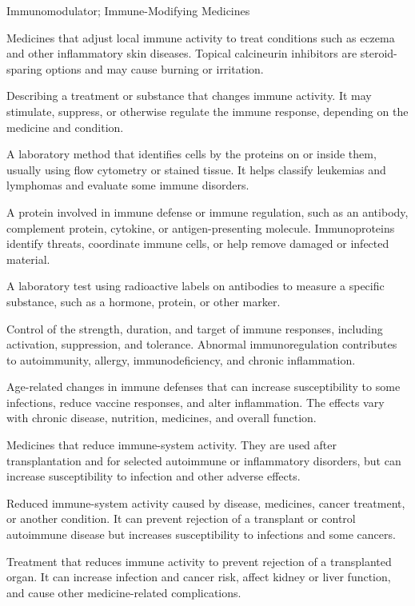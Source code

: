 \synonyms
Immunomodulator; Immune-Modifying Medicines

 Medicines that adjust local immune activity to treat conditions such as eczema and other inflammatory skin diseases. Topical calcineurin inhibitors are steroid-sparing options and may cause burning or irritation.

 Describing a treatment or substance that changes immune activity. It may stimulate, suppress, or otherwise regulate the immune response, depending on the medicine and condition.

 A laboratory method that identifies cells by the proteins on or inside them, usually using flow cytometry or stained tissue. It helps classify leukemias and lymphomas and evaluate some immune disorders.

 A protein involved in immune defense or immune regulation, such as an antibody, complement protein, cytokine, or antigen-presenting molecule. Immunoproteins identify threats, coordinate immune cells, or help remove damaged or infected material.

 A laboratory test using radioactive labels on antibodies to measure a specific substance, such as a hormone, protein, or other marker.

 Control of the strength, duration, and target of immune responses, including activation, suppression, and tolerance. Abnormal immunoregulation contributes to autoimmunity, allergy, immunodeficiency, and chronic inflammation.

 Age-related changes in immune defenses that can increase susceptibility to some infections, reduce vaccine responses, and alter inflammation. The effects vary with chronic disease, nutrition, medicines, and overall function.

 Medicines that reduce immune-system activity. They are used after transplantation and for selected autoimmune or inflammatory disorders, but can increase susceptibility to infection and other adverse effects.

 Reduced immune-system activity caused by disease, medicines, cancer treatment, or another condition. It can prevent rejection of a transplant or control autoimmune disease but increases susceptibility to infections and some cancers.

 Treatment that reduces immune activity to prevent rejection of a transplanted organ. It can increase infection and cancer risk, affect kidney or liver function, and cause other medicine-related complications.

